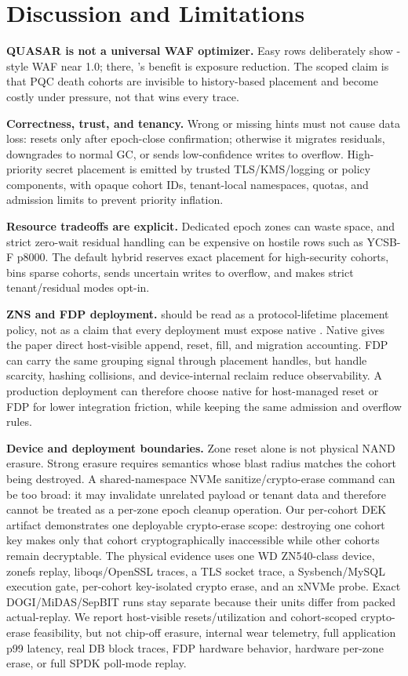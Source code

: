 \section{Discussion and Limitations}

\noindent\textbf{QUASAR is not a universal WAF optimizer.}
Easy rows deliberately show \dogi-style WAF near 1.0; there, \system's benefit is exposure reduction.  The scoped claim is that PQC death cohorts are invisible to history-based placement and become costly under pressure, not that \system wins every trace.

\noindent\textbf{Correctness, trust, and tenancy.}
Wrong or missing hints must not cause data loss: \system resets only after epoch-close confirmation; otherwise it migrates residuals, downgrades to normal GC, or sends low-confidence writes to overflow.  High-priority secret placement is emitted by trusted TLS/KMS/logging or policy components, with opaque cohort IDs, tenant-local namespaces, quotas, and admission limits to prevent priority inflation.

\noindent\textbf{Resource tradeoffs are explicit.}
Dedicated epoch zones can waste space, and strict zero-wait residual handling can be expensive on hostile rows such as YCSB-F p8000.  The default hybrid reserves exact placement for high-security cohorts, bins sparse cohorts, sends uncertain writes to overflow, and makes strict tenant/residual modes opt-in.

\noindent\textbf{ZNS and FDP deployment.}
\system should be read as a protocol-lifetime placement policy, not as a claim that every deployment must expose native \zns.  Native \zns gives the paper direct host-visible append, reset, fill, and migration accounting.  FDP can carry the same grouping signal through placement handles, but handle scarcity, hashing collisions, and device-internal reclaim reduce observability.  A production deployment can therefore choose native \zns for host-managed reset or FDP for lower integration friction, while keeping the same admission and overflow rules.

\noindent\textbf{Device and deployment boundaries.}
Zone reset alone is not physical NAND erasure.  Strong erasure requires semantics whose blast radius matches the cohort being destroyed.  A shared-namespace NVMe sanitize/crypto-erase command can be too broad: it may invalidate unrelated payload or tenant data and therefore cannot be treated as a per-zone epoch cleanup operation.  Our per-cohort DEK artifact demonstrates one deployable crypto-erase scope: destroying one cohort key makes only that cohort cryptographically inaccessible while other cohorts remain decryptable.  The physical evidence uses one WD ZN540-class device, zonefs replay, liboqs/OpenSSL traces, a TLS socket trace, a Sysbench/MySQL execution gate, per-cohort key-isolated crypto erase, and an xNVMe probe.  Exact DOGI/MiDAS/SepBIT runs stay separate because their units differ from packed actual-\zns replay.  We report host-visible resets/utilization and cohort-scoped crypto-erase feasibility, but not chip-off erasure, internal wear telemetry, full application p99 latency, real DB block traces, FDP hardware behavior, hardware per-zone erase, or full SPDK poll-mode replay.
